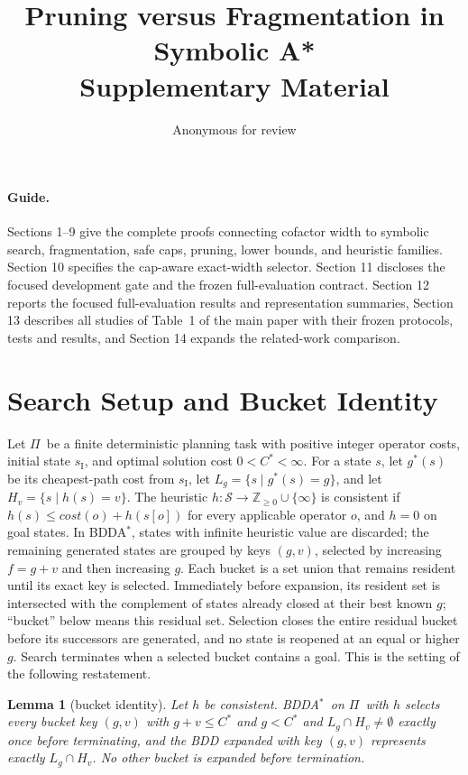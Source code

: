 \documentclass[letterpaper]{article}
\title{Pruning versus Fragmentation in Symbolic A*\\Supplementary Material}
\author{Anonymous for review}
\date{}
\newcommand{\task}{\ensuremath{\Pi}}
\newcommand{\sinit}{\ensuremath{s_{\mathrm{I}}}}
\newcommand{\cost}{\ensuremath{\mathit{cost}}}
\newcommand{\gstar}{\ensuremath{g^{*}}}
\newcommand{\copt}{\ensuremath{C^{*}}}
\newcommand{\level}[2]{\ensuremath{H_{#2}}}
\newcommand{\bddastar}{BDDA\ensuremath{^{*}}}
\theoremstyle{plain}
\newtheorem{lemma}{Lemma}
\theoremstyle{definition}
\theoremstyle{remark}
\begin{document}
\maketitle

\paragraph{Guide.}
Sections 1--9 give the complete proofs connecting cofactor width to symbolic
search, fragmentation, safe caps, pruning, lower bounds, and heuristic
families.
Section 10 specifies the cap-aware exact-width selector. Section 11 discloses
the focused development gate and the frozen full-evaluation contract. Section
12 reports the focused full-evaluation results and representation summaries,
Section 13 describes all studies of Table~1 of the main paper with their
frozen protocols, tests and results, and Section 14 expands the related-work
comparison.

\section{Search Setup and Bucket Identity}

Let \task\ be a finite deterministic planning task with positive integer
operator costs, initial state \sinit, and optimal solution cost
$0<\copt<\infty$.
For a state \(s\), let \(\gstar(s)\) be its cheapest-path cost from
\sinit, let \(L_g=\{s\mid\gstar(s)=g\}\), and let
\(\level{h}{v}=\{s\mid h(s)=v\}\).  The heuristic
\(h\colon\mathcal{S}\to\mathbb{Z}_{\geq0}\cup\{\infty\}\) is consistent if
\(h(s)\leq\cost(o)+h(s[o])\) for every applicable operator \(o\), and
\(h=0\) on goal states.  In \bddastar, states with infinite heuristic
value are discarded; the remaining generated states are grouped by keys
\((g,v)\), selected by increasing \(f=g+v\) and then increasing \(g\).
Each bucket is a set union that remains resident until its exact key is
selected. Immediately before expansion, its resident set is intersected with
the complement of states already closed at their best known $g$; ``bucket''
below means this residual set. Selection closes the entire residual bucket
before its successors are generated, and no state is reopened at an equal or
higher $g$. Search
terminates when a selected bucket contains a goal. This is the setting of the
following restatement.

\begin{lemma}[bucket identity]
\label{lem-identity}
Let $h$ be consistent. \bddastar\ on \task\ with $h$ selects every
bucket key $(g,v)$ with $g + v \leq \copt$ and $g < \copt$ and
$L_g \cap \level{h}{v} \neq \emptyset$ exactly once before terminating,
and the BDD expanded with key $(g,v)$ represents exactly
$L_g \cap \level{h}{v}$. No other bucket is expanded before
termination.
\end{lemma}
\end{document}
